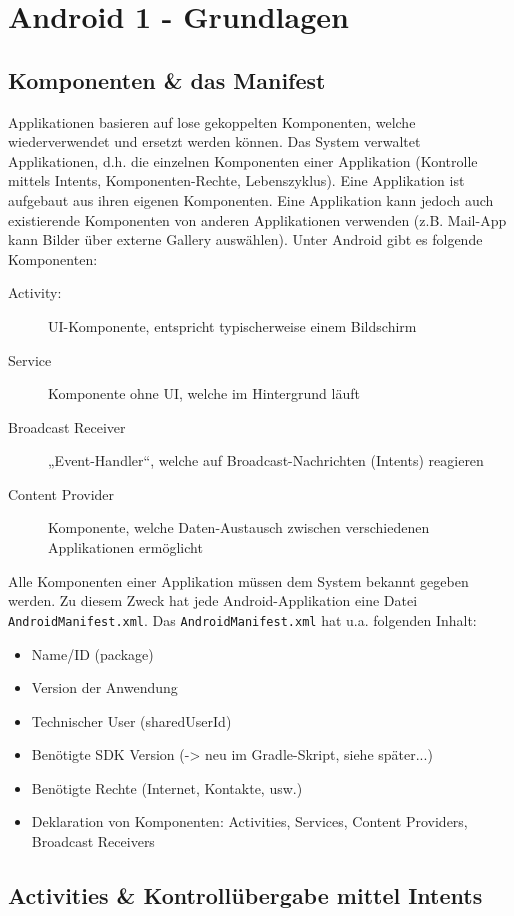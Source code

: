 \chapter{Android 1 - Grundlagen}

\section{Komponenten \& das Manifest}

Applikationen basieren auf lose gekoppelten Komponenten, welche wiederverwendet und ersetzt werden können. Das System verwaltet Applikationen, d.h. die einzelnen Komponenten einer Applikation (Kontrolle mittels Intents, Komponenten-Rechte, Lebenszyklus). Eine Applikation ist aufgebaut aus ihren eigenen Komponenten. Eine Applikation kann jedoch auch existierende Komponenten von anderen Applikationen verwenden (z.B. Mail-App kann Bilder über externe Gallery auswählen). Unter Android gibt es folgende Komponenten:
\begin{description}
	\item[Activity:] UI-Komponente, entspricht typischerweise einem Bildschirm
	\item[Service] Komponente ohne UI, welche im Hintergrund läuft
	\item[Broadcast Receiver] „Event-Handler“, welche auf Broadcast-Nachrichten (Intents) reagieren
	\item[Content Provider] Komponente, welche Daten-Austausch zwischen verschiedenen Applikationen ermöglicht
\end{description}
Alle Komponenten einer Applikation müssen dem System bekannt gegeben werden. Zu diesem Zweck hat jede Android-Applikation eine
Datei \texttt{AndroidManifest.xml}. Das \texttt{AndroidManifest.xml} hat u.a. folgenden Inhalt:
\begin{itemize}
	\item Name/ID (package)
	\item Version der Anwendung
	\item Technischer User (sharedUserId)
	\item Benötigte SDK Version (-> neu im Gradle-Skript, siehe später...)
	\item Benötigte Rechte (Internet, Kontakte, usw.)
	\item Deklaration von Komponenten: Activities, Services, Content Providers, Broadcast Receivers
\end{itemize}

\section{Activities \& Kontrollübergabe mittel Intents}

